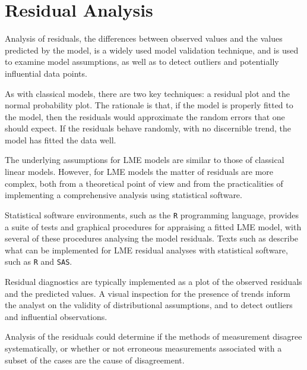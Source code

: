 \documentclass[12pt, a4paper]{report}
\theoremstyle{definition}
\theoremstyle{remark}
\begin{document}
\section{Residual Analysis}
Analysis of residuals, the differences between observed values and the values predicted by the model, is a widely used model validation technique, and is used to examine model assumptions, as well as to detect outliers and potentially influential data points. 

As with classical models, there are two key techniques: a residual plot and the normal probability plot. The rationale is that, if the model is properly fitted to the model, then the residuals would approximate the random errors that one should expect. If the residuals behave randomly, with no discernible trend, the model has fitted the data well. 

The underlying assumptions for LME models are similar to those of classical linear models. However, for LME models the matter of residuals are more complex, both from a theoretical point of view and from the practicalities of implementing a comprehensive analysis using statistical software.

Statistical software environments, such as the \texttt{R} programming language, provides a suite of tests and graphical procedures for appraising a fitted LME model, with several of these procedures analysing the model residuals. Texts such as \citet{PB,west,Galecki} describe what can be implemented for LME residual analyses with statistical software, such as \texttt{R} and \texttt{SAS}.



Residual diagnostics are typically implemented as a plot of the observed residuals and the predicted values. A visual inspection for the presence of trends inform the analyst on the validity of distributional assumptions, and to detect outliers and influential observations.



Analysis of the residuals could determine if the methods of measurement disagree systematically, or whether or not erroneous measurements associated with a subset of the cases are the cause of disagreement. 
\end{document}
